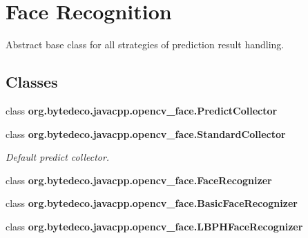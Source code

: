 \hypertarget{group__face}{}\section{Face Recognition}
\label{group__face}


Abstract base class for all strategies of prediction result handling.  


\subsection*{Classes}
\begin{DoxyCompactItemize}
\item 
class {\bfseries org.\+bytedeco.\+javacpp.\+opencv\+\_\+face.\+Predict\+Collector}
\item 
class {\bfseries org.\+bytedeco.\+javacpp.\+opencv\+\_\+face.\+Standard\+Collector}
\begin{DoxyCompactList}\small\item\em Default predict collector. \end{DoxyCompactList}\item 
class {\bfseries org.\+bytedeco.\+javacpp.\+opencv\+\_\+face.\+Face\+Recognizer}
\item 
class {\bfseries org.\+bytedeco.\+javacpp.\+opencv\+\_\+face.\+Basic\+Face\+Recognizer}
\item 
class {\bfseries org.\+bytedeco.\+javacpp.\+opencv\+\_\+face.\+L\+B\+P\+H\+Face\+Recognizer}
\end{DoxyCompactItemize}
